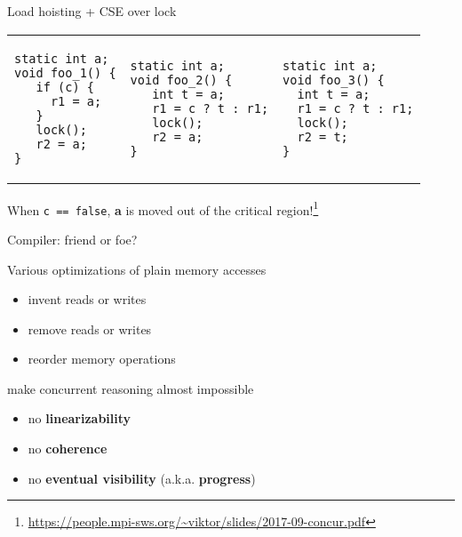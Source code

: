 \begin{frame}[t, fragile]{Load hoisting + CSE over lock}

\begin{tabular}{p{} p{} p{}}

\begin{verbatim}
static int a;
void foo_1() {
   if (c) {
     r1 = a;
   }
   lock();
   r2 = a;
}
\end{verbatim}

&

\begin{verbatim}
static int a;
void foo_2() {
   int t = a;
   r1 = c ? t : r1;
   lock();
   r2 = a;
}
\end{verbatim}

 &

\begin{verbatim}
static int a;
void foo_3() {
  int t = a;
  r1 = c ? t : r1;
  lock();
  r2 = t;
}
\end{verbatim}
\end{tabular}

\pause

When \texttt{c == false}, \textbf{a} is moved out of the critical region!\footnote<2->{\tiny\url{https://people.mpi-sws.org/~viktor/slides/2017-09-concur.pdf}}

\end{frame}

\begin{frame}[t, fragile]{Compiler: friend or foe?}

Various optimizations of plain memory accesses
\begin{itemize}
  \pause \item invent reads or writes
  \pause \item remove reads or writes
  \pause \item reorder memory operations
\end{itemize}

\pause
make concurrent reasoning almost impossible 
\begin{itemize}
  \pause \item no \textbf{linearizability}
  \pause \item no \textbf{coherence}
  \pause \item no \textbf{eventual visibility} (a.k.a. \textbf{progress})
\end{itemize}

\end{frame}


